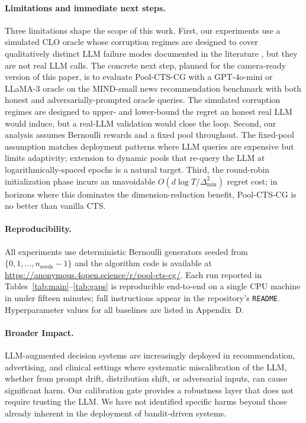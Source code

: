 \documentclass{article}
\theoremstyle{plain}
\theoremstyle{definition}
\theoremstyle{remark}
\newcommand{\gap}{\Delta_{\min}}
\newcommand{\algname}{Pool-CTS-CG}
\begin{document}
\paragraph{Limitations and immediate next steps.} Three limitations shape the scope of this work. First, our experiments use a simulated CLO oracle whose corruption regimes are designed to cover qualitatively distinct LLM failure modes documented in the literature \citep{krishnamurthy2024canllms,bayley2025jumpstart,park2025regret}, but they are not real LLM calls. The concrete next step, planned for the camera-ready version of this paper, is to evaluate \algname{} with a GPT-4o-mini or LLaMA-3 oracle on the MIND-small news recommendation benchmark with both honest and adversarially-prompted oracle queries. The simulated corruption regimes are designed to upper- and lower-bound the regret an honest real LLM would induce, but a real-LLM validation would close the loop. Second, our analysis assumes Bernoulli rewards and a fixed pool throughout. The fixed-pool assumption matches deployment patterns where LLM queries are expensive but limits adaptivity; extension to dynamic pools that re-query the LLM at logarithmically-spaced epochs is a natural target. Third, the round-robin initialization phase incurs an unavoidable $O(d \log T / \gap^2)$ regret cost; in horizons where this dominates the dimension-reduction benefit, \algname{} is no better than vanilla \textsc{CTS}.

\paragraph{Reproducibility.} All experiments use deterministic Bernoulli generators seeded from $\{0, 1, \dots, n_{\text{seeds}}-1\}$ and the algorithm code is available at \url{https://anonymous.4open.science/r/pool-cts-cg/}. Each run reported in Tables~\ref{tab:main}--\ref{tab:gaps} is reproducible end-to-end on a single CPU machine in under fifteen minutes; full instructions appear in the repository's \texttt{README}. Hyperparameter values for all baselines are listed in Appendix~D.

\paragraph{Broader Impact.} LLM-augmented decision systems are increasingly deployed in recommendation, advertising, and clinical settings where systematic miscalibration of the LLM, whether from prompt drift, distribution shift, or adversarial inputs, can cause significant harm. Our calibration gate provides a robustness layer that does not require trusting the LLM. We have not identified specific harms beyond those already inherent in the deployment of bandit-driven systems.
\end{document}
